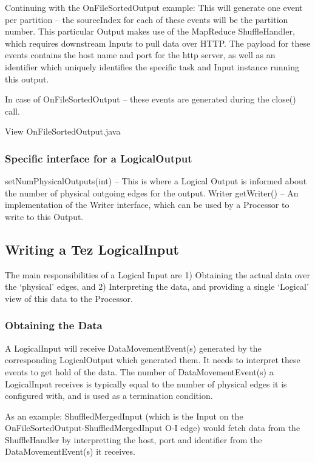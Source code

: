 \documentclass[twocolumn]{article}
\begin{document}
Continuing with the OnFileSortedOutput example: This will generate one
event per partition -- the sourceIndex for each of these events will be
the partition number. This particular Output makes use of the MapReduce
ShuffleHandler, which requires downstream Inputs to pull data over HTTP.
The payload for these events contains the host name and port for the
http server, as well as an identifier which uniquely identifies the
specific task and Input instance running this output.

In case of OnFileSortedOutput -- these events are generated during the
close() call.

View OnFileSortedOutput.java

\subsubsection{Specific interface for a LogicalOutput}

setNumPhysicalOutputs(int) -- This is where a Logical Output is informed
about the number of physical outgoing edges for the output. Writer
getWriter() -- An implementation of the Writer interface, which can be
used by a Processor to write to this Output.

\subsection{Writing a Tez LogicalInput}

The main responsibilities of a Logical Input are 1) Obtaining the actual
data over the `physical' edges, and 2) Interpreting the data, and
providing a single `Logical' view of this data to the Processor.

\subsubsection{Obtaining the Data}

A LogicalInput will receive DataMovementEvent(s) generated by the
corresponding LogicalOutput which generated them. It needs to interpret
these events to get hold of the data. The number of DataMovementEvent(s)
a LogicalInput receives is typically equal to the number of physical
edges it is configured with, and is used as a termination condition.

As an example: ShuffledMergedInput (which is the Input on the
OnFileSortedOutput-ShuffledMergedInput O-I edge) would fetch data from
the ShuffleHandler by interpretting the host, port and identifier from
the DataMovementEvent(s) it receives.
\end{document}
